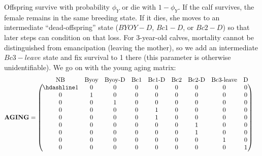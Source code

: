 \documentclass[
  12pt,
]{krantz}
\begin{document}
Offspring survive with probability \(\phi_Y\) or die with \(1-\phi_Y\). If the calf survives, the female remains in the same breeding state. If it dies, she moves to an intermediate ``dead-offspring'' state (\(BYOY-D\), \(Bc1-D\), or \(Bc2-D\)) so that later steps can condition on that loss. For 3-year-old calves, mortality cannot be distinguished from emancipation (leaving the mother), so we add an intermediate \(Bc3-leave\) state and fix survival to 1 there (this parameter is otherwise unidentifiable). We go on with the young aging matrix:
\[
\begin{matrix}
& \\
\mathbf{AGING} =
\left ( \vphantom{ \begin{matrix} 12 \\ 12 \\ 12 \\ 12 \\ 12 \\ 12 \\ 12 \\ 12 \\ 12 \end{matrix} } \right .
\end{matrix}
\hspace{-1.2em}
\begin{matrix}
\text{NB} & \text{Byoy} & \text{Byoy-D} & \text{Bc1} & \text{Bc1-D} & \text{Bc2} & \text{Bc2-D} & \text{Bc3-leave} & \text{D} \\ \hdashline
1 & 0 & 0 & 0 & 0 & 0 & 0 & 0 & 0 \\
0 & 1 & 0 & 0 & 0 & 0 & 0 & 0 & 0 \\
0 & 0 & 1 & 0 & 0 & 0 & 0 & 0 & 0 \\
0 & 0 & 0 & 0 & 1 & 0 & 0 & 0 & 0 \\
0 & 0 & 0 & 0 & 1 & 0 & 0 & 0 & 0 \\
0 & 0 & 0 & 0 & 0 & 0 & 1 & 0 & 0 \\
0 & 0 & 0 & 0 & 0 & 0 & 1 & 0 & 0 \\
0 & 0 & 0 & 0 & 0 & 0 & 0 & 1 & 0 \\
0 & 0 & 0 & 0 & 0 & 0 & 0 & 0 & 1
\end{matrix}
\hspace{-0.2em}
\begin{matrix}
& \\
\left . \vphantom{ \begin{matrix} 12 \\ 12 \\ 12 \\ 12 \\ 12 \\ 12 \\ 12 \\ 12 \\ 12 \end{matrix} } \right )

\end{matrix}\]
\end{document}
